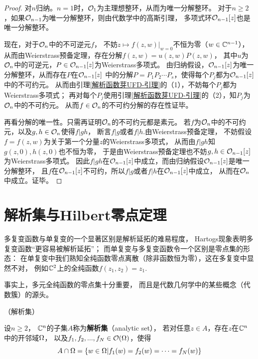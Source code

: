 \begin{proof}
对$n$归纳。$n=1$时，$\mathcal{O}_1$为主理想整环，从而为唯一分解整环。
对于$n\geq 2$，如果$\mathcal{O}_{n-1}$为唯一分解整环，则由代数学中的高斯引理，
多项式环$\mathcal{O}_{n-1}[z]$也是唯一分解整环。

现在，对于$\mathcal{O}_n$中的不可逆元$f$，
不妨$z\mapsto f(z,w)|_{w=0}$不恒为零（$w\in\mathbb{C}^{n-1}$），
从而由Weierstrass预备定理，存在分解$f(z,w)=u(z,w)P(z,w)$，
其中$u$为$\mathcal{O}_n$中的可逆元，$P\in\mathcal{O}_{n-1}[z]$为Weierstrass多项式。
由归纳假设，$\mathcal{O}_{n-1}[z]$为唯一分解整环，从而存在$P$在$\mathcal{O}_{n-1}[z]$
中的分解$P=P_1P_2\cdots P_s$，使得每个$P_j$都为$\mathcal{O}_{n-1}[z]$中的不可约元。
从而由引理\ref{解析函数芽UFD-引理}的（1），不妨每个$P_j$都为Weierstrass多项式；
再对每个$P_j$使用引理\ref{解析函数芽UFD-引理}的（2），知$P_j$为$\mathcal{O}_n$中的不可约元。
从而$f\in\mathcal{O}_n$的不可约分解的存在性证毕。

再看分解的唯一性。只需再证明$\mathcal{O}_n$的不可约元都是素元。
若$f$为$\mathcal{O}_n$中的不可约元，以及$g,h\in\mathcal{O}_n$使得$f|gh$，
断言$f|g$或者$f|h$.由Weierstrass预备定理，
不妨假设$f=f(z,w)$为关于第一个分量$z$的Weierstrass多项式，
从而由$f|gh$知$g(z,0),h(z,0)$也不恒为零，
于是由Weierstrass预备定理也不妨$g,h\in\mathcal{O}_{n-1}[z]$为Weierstrass多项式。
因此$f|gh$在$\mathcal{O}_{n-1}[z]$中成立，而由归纳假设$\mathcal{O}_{n-1}[z]$是唯一分解整环，
且$f$在$\mathcal{O}_{n-1}[z]$不可约，所以$f|g$或者$f|h$在$\mathcal{O}_{n-1}[z]$中成立，
从而在$\mathcal{O}_n$中成立。证毕。
\end{proof}

\section{解析集与Hilbert零点定理}
多复变函数与单复变的一个显著区别是解析延拓的难易程度，
Hartogs现象表明多复变函数“更容易被解析延拓”；
而单复变与多复变函数令一个区别是零点集的形态：
在单复变中我们熟知全纯函数零点离散（除非函数恒为零），这在多复变中显然不对，
例如$\mathbb{C}^2$上的全纯函数$f(z_1,z_2)=z_1$.

事实上，多元全纯函数的零点集十分重要，
而且是代数几何学中的某些概念（代数簇）的源头。

\begin{definition}（解析集）

设$n\geq 2$， $\mathbb{C}^n$的子集$A$称为\textbf{解析集}（analytic set），
若对任意$z\in A$，存在$z$在$\mathbb{C}^n$中的开邻域$\Omega$，
以及$f_1,f_2,...,f_N\in\mathcal{O}(\Omega)$，使得
$$A\cap\Omega=\{w\in\Omega|f_1(w)=f_2(w)=\cdots=f_N(w)\}$$
\end{definition}

